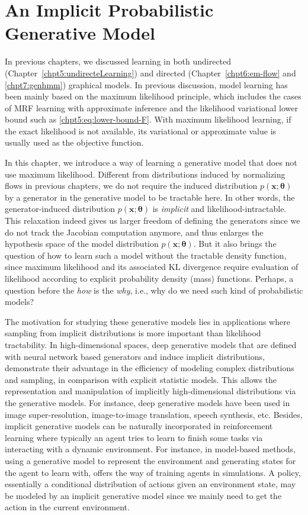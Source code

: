 \chapter{An Implicit Probabilistic Generative Model}
\label{chapter8}
\graphicspath{{source/chapter8/}}
In previous chapters, we discussed learning in both undirected (Chapter~\ref{chpt5:undirecteLearning}) and directed (Chapter~\ref{chpt6:em-flow} and \ref{chpt7:genhmm}) graphical models. In previous discussion, model learning has been mainly based on the maximum likelihood principle, which includes the cases of MRF learning with approximate inference and the likelihood variational lower bound such as \eqref{chpt5:eq:lower-bound-F}. With maximum likelihood learning, if the exact likelihood is not available, its variational or approximate value is usually used as the objective function.

In this chapter, we introduce a way of learning a generative model that does not use maximum likelihood. Different from distributions induced by normalizing flows in previous chapters, we do not require the induced distribution $p(\bm{x};\bm{\theta})$ by a generator in the generative model to be tractable here. In other words, the generator-induced distribution $p(\bm{x};\bm{\theta})$ is \textit{implicit} and likelihood-intractable. This relaxation indeed gives us larger freedom of defining the generators since we do not track the Jacobian computation anymore, and thus enlarges the hypothesis space of the model distribution $p(\bm{x};\bm{\theta})$. But it also brings the question of how to learn such a model without the tractable density function, since maximum likelihood and its associated KL divergence require evaluation of likelihood according to explicit probability density (mass) functions.  Perhaps, a question before the \textit{how} is the \textit{why}, i.e., why do we need such kind of probabilistic models?

The motivation for studying these generative models lies in applications where sampling from implicit distributions is more important than likelihood tractability. In high-dimensional spaces, deep generative models that are defined with neural network based generators and induce implicit distributions, demonstrate their advantage in the efficiency of modeling complex distributions and sampling, in comparison with explicit statistic models. This allows the representation and manipulation of implicitly high-dimensional distributions via the generative models. For instance, deep generative models have been used in image super-resolution, image-to-image translation, speech synthesis, etc. Besides, implicit generative models can be naturally incorporated in reinforcement learning where typically an agent tries to learn to finish some tasks via interacting with a dynamic environment. For instance, in model-based methods, using a generative model to represent the environment and generating states for the agent to learn with, offers the way of training agents in simulations. A policy, essentially a conditional distribution of actions given an environment state, may be modeled by an implicit generative model since we mainly need to get the action in the current environment.

